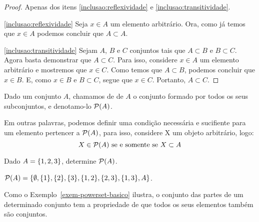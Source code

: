 \begin{proof}
	Apenas dos itens \ref{inclusao:reflexividade} e \ref{inclusao:transitividade}.

	\ref{inclusao:reflexividade}
	Seja $x \in A$ um elemento arbitrário.
	Ora, como já temos que $x \in A$ podemos concluir que $A \subset A$.


	\ref{inclusao:transitividade}
	Sejam $A$, $B$ e $C$ conjuntos tais que $A \subset B$ e $B \subset C$.
	Agora basta demonstrar que $A \subset C$.
	Para isso, considere $x \in A$ um elemento arbitrário e mostremos que $x \in C$.
	Como temos que $A \subset B$, podemos concluir que $x \in B$.
	E, como $x \in B$ e $B \subset C$, segue que $x \in C$.
	Portanto, $A \subset C$.
\end{proof}

\begin{definition}
\label{def:powerset}
Dado um conjunto $A$, chamamos de  de $A$ o conjunto formado por todos os seus subconjuntos, e denotamo-lo $\mathcal{P}(A)$.
\end{definition}

Em outras palavras, podemos definir uma condição necessária e sucifiente para um elemento pertencer a $\mathcal{P}(A)$, para isso, considere X um objeto arbitrário, logo:
$$ X \in \mathcal{P}(A) \text{ se e somente se } X \subset A $$

\begin{example}
\label{exem-powerset-basico}
Dado $A = \left\{ 1,2,3\right\}$, determine $\mathcal{P}(A)$.
\end{example}

\begin{solution}

$\mathcal{P}(A)=\{\emptyset,\{1\}, \{2\}, \{3\}, \{1,2\}, \{2,3\}, \{1,3\},A\}$.
\end{solution}

\begin{remark}
Como o Exemplo~\ref{exem-powerset-basico} ilustra, o conjunto das partes de um determinado conjunto tem a propriedade de que todos os seus elementos também são conjuntos.
\end{remark}
